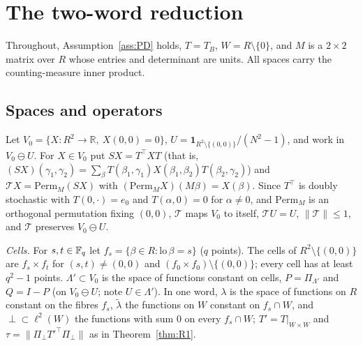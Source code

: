 \section{The two-word reduction}\label{app:mix}

Throughout, Assumption~\ref{ass:PD} holds, $T=T_B$, $W=R\setminus\{0\}$, and $M$ is a $2\times2$ matrix over $R$ whose entries and
determinant are units. All spaces carry the counting-measure inner product.

\subsection{Spaces and operators}
Let $V_0=\{X:R^2\to\mathbb R,\ X(0,0)=0\}$, $U=\mathbf 1_{R^2\setminus\{(0,0)\}}/(N^2-1)$, and work in $V_0\ominus U$. For $X\in V_0$ put
$SX=T^\top XT$ (that is, $(SX)(\gamma_1,\gamma_2)=\sum_{\beta}T(\beta_1,\gamma_1)X(\beta_1,\beta_2)T(\beta_2,\gamma_2)$) and $\mathcal TX=\mathrm{Perm}_M(SX)$ with
$(\mathrm{Perm}_MX)(M\beta)=X(\beta)$. Since $T^\top$ is doubly stochastic with $T(0,\cdot)=e_0$ and $T(\alpha,0)=0$ for $\alpha\ne0$, and $\mathrm{Perm}_M$ is an
orthogonal permutation fixing $(0,0)$, $\mathcal T$ maps $V_0$ to itself, $\mathcal TU=U$, $\|\mathcal T\|\le1$, and $\mathcal T$ preserves $V_0\ominus U$.

\emph{Cells.} For $s,t\in\mathbb{F}_q$ let $f_s=\{\beta\in R:\mathrm{lo}\,\beta=s\}$ ($q$ points). The cells of $R^2\setminus\{(0,0)\}$ are $f_s\times f_t$ for
$(s,t)\ne(0,0)$ and $(f_0\times f_0)\setminus\{(0,0)\}$; every cell has at least $q^2-1$ points. $\Lambda'\subset V_0$ is the space of functions
constant on cells, $P=\Pi_{\Lambda'}$ and $Q=I-P$ (on $V_0\ominus U$; note $U\in\Lambda'$). In one word, $\lambda$ is the space of functions on
$R$ constant on the fibres $f_s$, $\tilde\lambda$ the functions on $W$ constant on $f_s\cap W$, and $\perp\subset\ell^2(W)$ the functions with sum $0$
on every $f_s\cap W$; $T'=T|_{W\times W}$ and $\tau=\|\Pi_\perp T'^\top\Pi_\perp\|$ as in Theorem~\ref{thm:R1}.

